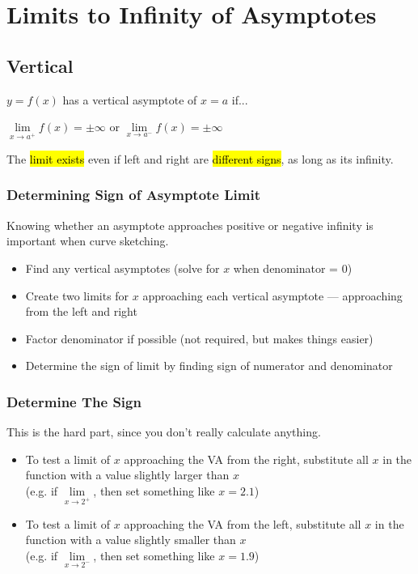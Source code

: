 \documentclass[a4paper,12pt]{article}
\begin{document}
\section{Limits to Infinity of Asymptotes}
\subsection{Vertical}
$y = f(x)$ has a vertical asymptote of $x = a$ if...

\begin{center}
$\lim\limits_{x \to a^+} f(x) = \pm\infty$ \;\;\;or\;\;\; $\lim\limits_{x \to a^-} f(x) = \pm\infty$
\end{center}

The \hl{limit exists} even if left and right are \hl{different signs}, as long as its infinity.

\subsubsection{Determining Sign of Asymptote Limit}
Knowing whether an asymptote approaches positive or negative infinity is important when curve sketching.

\begin{itemize}
    \item{Find any vertical asymptotes (solve for $x$ when denominator = 0)}
    \item{Create two limits for $x$ approaching each vertical asymptote --- approaching from the left and right}
    \item{Factor denominator if possible (not required, but makes things easier)}
    \item{Determine the sign of limit by finding sign of numerator and denominator}
\end{itemize}

\subsubsection{Determine The Sign}
This is the hard part, since you don't really calculate anything.

\begin{itemize}
    \item{To test a limit of $x$ approaching the VA from the right, substitute all $x$ in the function with a value slightly larger than $x$ \\(e.g. if $\lim\limits_{x \to 2^+}$, then set something like $x = 2.1$)}
    \item{To test a limit of $x$ approaching the VA from the left, substitute all $x$ in the function with a value slightly smaller than $x$ \\(e.g. if $\lim\limits_{x \to 2^-}$, then set something like $x = 1.9$)}
\end{itemize}
\end{document}
